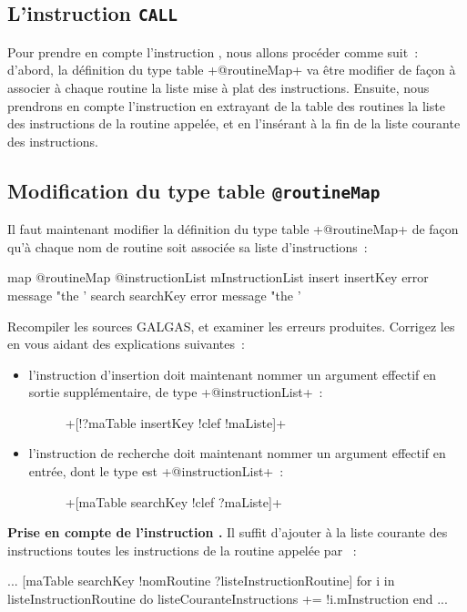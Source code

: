 \subsection{L'instruction \texttt{CALL}}
Pour prendre en compte l’instruction , nous allons procéder comme suit~: d’abord, la définition du type table \ggst+@routineMap+ va être modifier de façon à associer à chaque routine la liste mise à plat des instructions. Ensuite, nous prendrons en compte l’instruction  en extrayant de la table des routines la liste des instructions de la routine appelée, et en l’insérant à la fin de la liste courante des instructions.

\subsection{Modification du type table \texttt{@routineMap}}
Il faut maintenant modifier la définition du type table \ggst+@routineMap+ de façon qu'à chaque nom de routine soit associée sa liste d'instructions~:

\begin{galgas3}
map @routineMap {
  @instructionList mInstructionList
  insert insertKey  error message "the '%
  search searchKey error message "the '%
}
\end{galgas3}

Recompiler les sources GALGAS, et examiner les erreurs produites. Corrigez les en vous aidant des explications suivantes~:
\begin{itemize}
  \item l'instruction d'insertion doit maintenant nommer un argument effectif en sortie supplémentaire, de type \ggst+@instructionList+~:
  \begin{description}
    \item[ ] \ggst+[!?maTable insertKey !clef !maListe]+
  \end{description}
  \item l'instruction de recherche doit maintenant nommer un argument effectif en entrée, dont le type est \ggst+@instructionList+~:
  \begin{description}
    \item[ ] \ggst+[maTable searchKey !clef ?maListe]+
  \end{description}
\end{itemize}

{\bf Prise en compte de l'instruction .} Il suffit d'ajouter à la liste courante des instructions toutes les instructions de la routine appelée par ~:
\begin{galgas3}
...
[maTable searchKey !nomRoutine ?listeInstructionRoutine]
for i in listeInstructionRoutine do
  listeCouranteInstructions += !i.mInstruction
end
...
\end{galgas3}

